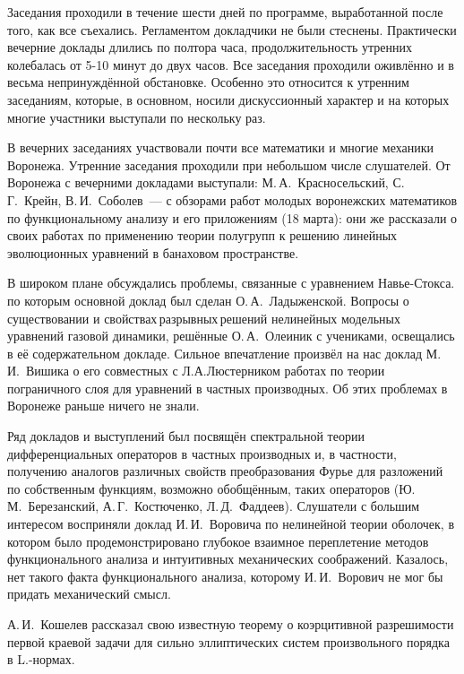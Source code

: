 Заседания проходили в течение шести дней по программе, выработанной после того, как все съехались.
Регламентом докладчики не были стеснены.
Практически вечерние доклады длились по полтора часа,
продолжительность
\linebreak
утренних колебалась от 5-10 минут до двух часов.
Все заседания проходили оживлённо и в весьма непринуждённой обстановке. Особенно это относится к утренним заседаниям, которые, в основном, носили дискуссионный характер и на которых многие участники выступали по нескольку раз.

В вечерних заседаниях участвовали почти все математики и многие механики Воронежа.
Утренние заседания проходили при небольшом числе слушателей.
От Воронежа с вечерними докладами выступали:
М.\,А.~Красносельский,
\linebreak
С.\,Г.~Крейн, В.\,И.~Соболев~--- с обзорами работ молодых воронежских математиков по функциональному анализу и его приложениям (18 марта): они же рассказали о своих работах по применению теории полугрупп к решению линейных эволюционных уравнений в банаховом пространстве.

В широком плане обсуждались проблемы, связанные с уравнением Навье-Стокса. по которым основной доклад был сделан О.\,А.~Ладыженской. Вопросы о существовании и \linebreak свойствах\,разрывных\,решений нелинейных модельных уравнений газовой динамики, решённые О.\,А.~Олеиник с учениками, освещались в её содержательном докладе. Сильное впечатление произвёл на нас доклад М.\,И.~Вишика о его совместных с Л.А.Люстерником работах по теории пограничного слоя для уравнений в частных производных. Об этих проблемах в Воронеже раньше ничего не знали.

Ряд докладов и выступлений был посвящён спектральной теории дифференциальных операторов в частных производных и,
в частности, получению аналогов различных свойств преобразования Фурье для разложений по собственным функциям,
возможно обобщённым, таких операторов
(Ю.\,М.~Березанский, А.\,Г.~Костюченко, Л.\,Д.~Фаддеев).
Слушатели с большим интересом восприняли доклад И.\,И.~Воровича по нелинейной теории оболочек,
в котором было продемонстрировано глубокое взаимное переплетение методов функционального анализа и интуитивных механических соображений. Казалось, нет такого факта функционального анализа, которому И.\,И.~Ворович не мог бы придать механический смысл.

А.\,И.~Кошелев рассказал свою известную теорему о коэрцитивной разрешимости первой краевой задачи для сильно эллиптических систем произвольного порядка в L.-нормах.

